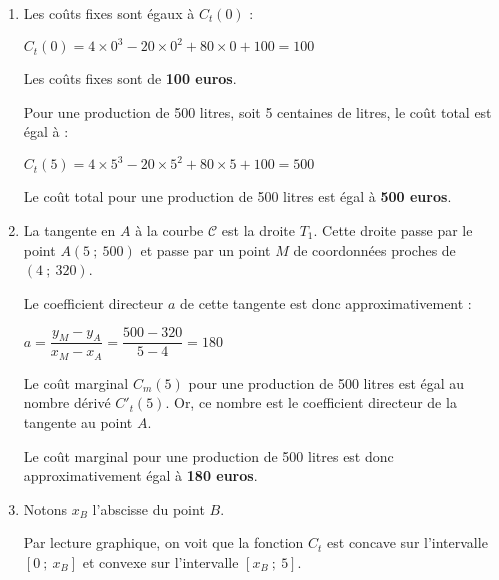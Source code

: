\begin{corrige}
     \par
     \begin{enumerate}
          \item %
          Les coûts fixes sont égaux à $C_t(0)$ :
          \par
          $C_t(0)=4 \times 0^3 -20 \times 0^2 + 80 \times 0 + 100 = 100$
          \par
          Les coûts fixes sont de \textbf{100 euros}.
          \par
          Pour une production de 500 litres, soit 5 centaines de litres, le coût total est égal à :
          \par
          $C_t(5)=4 \times 5^3 -20 \times 5^2 + 80 \times 5 + 100 = 500$
          \par
          Le coût total pour une production de 500 litres est égal à \textbf{500 euros}.
          \item %
          La tangente en $A$ à la courbe $\mathscr{C}$ est la droite $T_1$. Cette droite passe par le point $A(5~;~500)$ et passe par un point $M$ de coordonnées proches de $(4~;~320)$.
          \par
          Le coefficient directeur $a$ de cette tangente est donc approximativement :
          \par
          $a=\dfrac{y_M-y_A}{x_M-x_A}=\dfrac{500-320}{5-4}=180$
          \par
          Le coût marginal $C_m(5)$ pour une production de 500 litres est égal au nombre dérivé $C'_t(5)$. Or, ce nombre est le coefficient directeur de la tangente au point $A$.
          \par
          \par
          Le coût marginal pour une production de 500 litres est donc approximativement égal à \textbf{180 euros}.
          \item %
          Notons $x_B$ l'abscisse du point $B$.
          \par
          Par lecture graphique, on voit que la fonction $C_t$ est concave sur l'intervalle $[0~;~x_B]$ et convexe sur l'intervalle $[x_B~;~5]$.

\end{enumerate}
\end{corrige}
